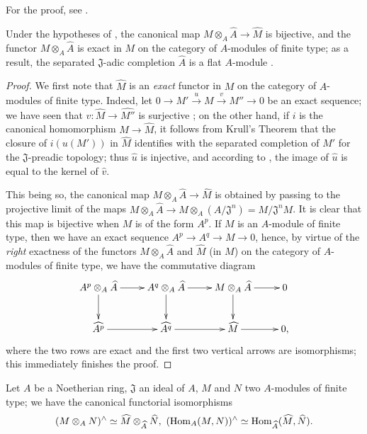 For the proof, see \cite[p.~2--04]{I-1}.

\begin{corollary}[7.3.3]
\label{0.7.3.3}
Under the hypotheses of , the canonical map
$M\otimes_A\widehat{A}\to\widehat{M}$ is bijective, and the functor $M\otimes_A\widehat{A}$
is exact in $M$ on the category of $A$-modules of finite type; as a result, the separated
$\mathfrak{J}$-adic completion $\widehat{A}$ is a flat $A$-module
.
\end{corollary}

\begin{proof}
We first note that $\widehat{M}$ is an \emph{exact} functor in $M$ on the category of
$A$-modules of finite type. Indeed, let $0\to M'\xrightarrow{u}M\xrightarrow{v}M''\to 0$ be
an exact sequence; we have seen that $\widehat{v}:\widehat{M}\to\widehat{M''}$ is surjective
; on the other hand, if $i$ is the canonical homomorphism
$M\to\widehat{M}$, it follows from Krull's Theorem  that the
closure of $i(u(M'))$ in $\widehat{M}$ identifies with the separated completion of $M'$ for
the $\mathfrak{J}$-preadic topology; thus $\widehat{u}$ is injective, and according to
, the image of $\widehat{u}$ is equal to the kernel of
$\widehat{v}$.

This being so, the canonical map $M\otimes_A\widehat{A}\to\widehat{M}$ is obtained by passing
to the projective limit of the maps
$M\otimes_A\widehat{A}\to M\otimes_A(A/\mathfrak{J}^n)=M/\mathfrak{J}^n M$. It is clear that
this map is bijective when $M$ is of the form $A^p$. If $M$ is an $A$-module of finite type,
then we have an exact sequence $A^p\to A^q\to M\to 0$, hence, by virtue of the \emph{right}
exactness of the functors $M\otimes_A\widehat{A}$ and $\widehat{M}$ (in $M$) on the category
of $A$-modules of finite type, we have the commutative diagram
\[
  \xymatrix{
    A^p\otimes_A\widehat{A}\ar[r]\ar[d] &
    A^q\otimes_A\widehat{A}\ar[r]\ar[d] &
    M\otimes_A\widehat{A}\ar[r]\ar[d] &
    0\\
    \widehat{A^p}\ar[r] &
    \widehat{A^q}\ar[r] &
    \widehat{M}\ar[r] &
    0,
  }
\]
where the two rows are exact and the first two vertical arrows are isomorphisms; this
immediately finishes the proof.
\end{proof}

\begin{corollary}[7.3.4]
\label{0.7.3.4}
Let $A$ be a Noetherian ring, $\mathfrak{J}$ an ideal of $A$, $M$ and $N$ two $A$-modules of
finite type; we have the canonical functorial isomorphisms
\[
  (M\otimes_A N)^\wedge\isoto\widehat{M}\otimes_{\widehat{A}}\widehat{N},\ (\Hom_A(M,N))^\wedge\isoto\Hom_{\widehat{A}}(\widehat{M},\widehat{N}).
\]
\end{corollary}

